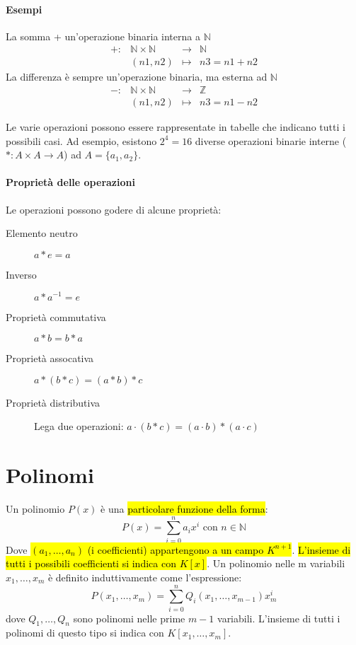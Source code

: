 \paragraph{Esempi}La somma + un'operazione binaria interna a $\mathbb{N}$
\[
    \begin{array}{cccc}
       +: &\mathbb{N} \times \mathbb{N} &\to &\mathbb{N} \\
        &(n1, n2) &\mapsto &n3 = n1 + n2
    \end{array}
\]
La differenza è sempre un'operazione binaria, ma esterna ad $\mathbb{N}$
\[
    \begin{array}{cccc}
        -: &\mathbb{N} \times \mathbb{N} &\to &\mathbb{Z} \\
        &(n1, n2) &\mapsto &n3 = n1 - n2
    \end{array}
\]

Le varie operazioni possono essere rappresentate in tabelle che indicano tutti i
possibili casi. Ad esempio, esistono $2^4 = 16$ diverse operazioni binarie
interne ($\ast: A \times A \to A$) ad $A = \{a_1, a_2\}$.

\paragraph{Proprietà delle operazioni} Le operazioni possono godere di alcune
proprietà:
\begin{description}
    \item[Elemento neutro] $a \ast e = a$
    \item[Inverso] $a \ast a^{-1} = e$
    \item[Proprietà commutativa] $a \ast b = b \ast a$
    \item[Proprietà assocativa] $a \ast (b \ast c) = (a \ast b) \ast c$
    \item[Proprietà distributiva] Lega due operazioni:
        $a \cdot (b \ast c) = (a \cdot b) \ast (a \cdot c)$
\end{description}

\section{Polinomi}
Un polinomio $P(x)$ è una \hl{particolare funzione della forma}:
\[
    P(x) = \sum_{i=0}^{n} a_i x^i \text{ con } n \in \mathbb{N}
\]
Dove \hl{$(a_1, \ldots, a_n)$ (i coefficienti) appartengono a un campo $K^{n+1}$}.
\hl{L'insieme di tutti i possibili coefficienti si indica con $K[x]$}.
Un polinomio nelle m variabili $x_1, \dots ,x_m$ è definito induttivamente come
l’espressione:
\[
    P(x_1, \ldots, x_m) = \sum_{i=0}^n Q_i(x_1, \ldots, x_{m-1})x_m^i
\]
dove $Q_1, \ldots, Q_n$ sono polinomi nelle prime $m - 1$ variabili. L’insieme
di tutti i polinomi di questo tipo si indica con $K[x_1, \ldots, x_m]$.

